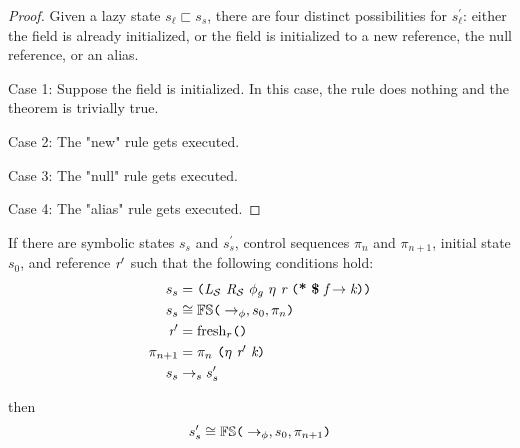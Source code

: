 \begin{proof}%
Given a lazy state $s_\ell \sqsubset s_s$, there are four distinct possibilities for $s_\ell^\prime$: either the field is already initialized, or the field is initialized to a new reference, the null reference, or an alias.

Case 1: Suppose the field is initialized. In this case, the rule does nothing and the theorem is trivially true.


Case 2: The "new" rule gets executed. 

Case 3: The "null" rule gets executed.

Case 4: The "alias" rule gets executed.
\end{proof}

\begin{lemma}
If there are symbolic states $s_s$ and $s_s^\prime$, control sequences $\pi_n$ and $\pi_{n+1}$, initial state $s_0$, and reference $\emph{r}^\prime$ such that the following conditions hold:
\begin{align}
s_s &= \lp \cfgnt{L}_{\mathcal{S}}\ \cfgnt{R}_{\mathcal{S}}\ \phi_g\ \eta\ \cfgnt{r}\ \lp \cfgt{*}\ \cfgt{\$}\ \cfgnt{f} \rightarrow \cfgnt{k}\rp \rp \\
s_s &\cong \mathbb{FS}\lp \rightarrow_{\phi},s_0,\pi_n\rp \\
\cfgnt{r}^\prime &= \mathrm{fresh}_r\lp \rp \\
\pi_{n+1} &=\pi_n\ \lp \eta\ \cfgnt{r}^\prime\ \cfgnt{k} \rp \\
s_s &\rightarrow_s s_s^\prime
\end{align}

then 
$$s_s^\prime \cong \mathbb{FS}\texttt{(} \rightarrow_{\phi},s_0,\pi_{n+1} \texttt{)}$$
\end{lemma}


